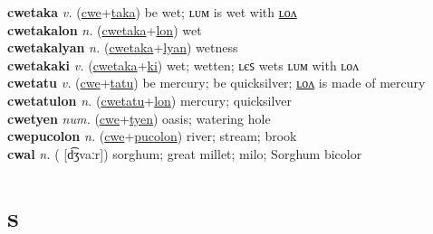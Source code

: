 \textbf{cwetaka} \textit{v.} (\hyperref[cwe]{cwe}+\hyperref[taka]{taka})
be wet; ʟᴜᴍ is wet with \hyperref[cwetakalon]{ʟᴏᴧ} \label{cwetaka} \\
\textbf{cwetakalon} \textit{n.} (\hyperref[cwetaka]{cwetaka}+\hyperref[lon]{lon})
wet \label{cwetakalon} \\
\textbf{cwetakalyan} \textit{n.} (\hyperref[cwetaka]{cwetaka}+\hyperref[lyan]{lyan})
wetness \label{cwetakalyan} \\
\textbf{cwetakaki} \textit{v.} (\hyperref[cwetaka]{cwetaka}+\hyperref[ki]{ki})
wet; wetten; ʟєꜱ wets ʟᴜᴍ with ʟᴏᴧ \label{cwetakaki} \\
\textbf{cwetatu} \textit{v.} (\hyperref[cwe]{cwe}+\hyperref[tatu]{tatu})
be mercury; be quicksilver; \hyperref[cwetatulon]{ʟᴏᴧ} is made of mercury \label{cwetatu} \\
\textbf{cwetatulon} \textit{n.} (\hyperref[cwetatu]{cwetatu}+\hyperref[lon]{lon})
mercury; quicksilver \label{cwetatulon} \\
\textbf{cwetyen} \textit{num.} (\hyperref[cwe]{cwe}+\hyperref[tyen]{tyen})
oasis; watering hole \label{cwetyen} \\
\textbf{cwepucolon} \textit{n.} (\hyperref[cwe]{cwe}+\hyperref[pucolon]{pucolon})
river; stream; brook \label{cwepucolon} \\
\textbf{cwal} \textit{n.} ( [d͡ʒvaːr])
sorghum; great millet; milo; Sorghum bicolor \label{cwal} 

\section{s}

